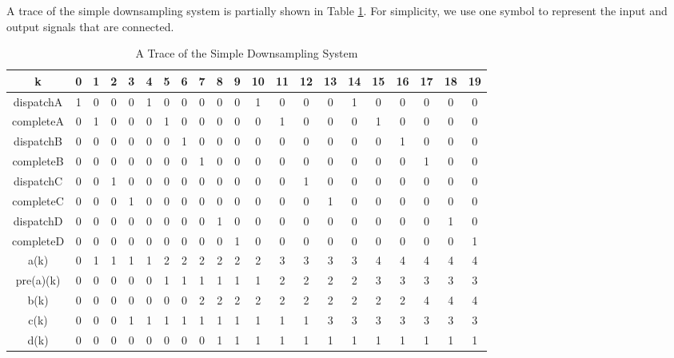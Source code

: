 
A trace of the simple downsampling system is partially shown in Table \ref{tab:table1}. For simplicity, we use one symbol to represent the input and output signals that are connected.
\begin{table}[h!]
\begin{center}
\caption{A Trace of the Simple Downsampling System}
\label{tab:table1}
\begin{tabular}{ |c|c|c|c|c|c|c|c|c|c|c|c|c|c|c|c|c|c|c|c|c|} 
\hline
            k & 0 & 1 & 2 & 3 & 4 & 5 & 6 & 7 & 8 & 9 & 10  & 11 & 12 & 13 & 14 & 15 & 16 & 17 & 18 & 19 \\
\hline
dispatchA  & 1 & 0 & 0 & 0 & 1 & 0 & 0 & 0 & 0 & 0 & 1 & 0 & 0 & 0 & 1 & 0 & 0 & 0 & 0 & 0  \\ 
\hline
completeA & 0 & 1 & 0 & 0 & 0 & 1 & 0 & 0 & 0 & 0 & 0 & 1 & 0 & 0 & 0 & 1 & 0 & 0 & 0 & 0  \\ 
\hline
dispatchB & 0 & 0 & 0 & 0 & 0 & 0 & 1 & 0 & 0 & 0 & 0 & 0 & 0 & 0 & 0 & 0 & 1 & 0 & 0 & 0  \\ 
\hline
completeB & 0 & 0 & 0 &0 & 0 & 0 & 0 & 1 & 0 & 0 & 0 & 0 & 0 & 0 & 0 & 0 & 0 & 1 & 0 & 0 \\ 
\hline
dispatchC & 0 & 0 & 1 & 0 & 0 & 0 & 0 & 0 & 0 & 0 & 0 & 0 & 1 & 0 & 0 & 0 & 0 & 0 & 0 & 0  \\ 
\hline
completeC & 0 & 0 & 0 & 1  & 0 & 0 & 0 & 0 & 0 & 0 & 0 & 0 & 0 & 1 & 0 & 0 & 0 & 0 & 0 & 0 \\ 
\hline
dispatchD & 0 & 0 & 0 & 0 & 0 & 0 & 0 & 0 & 1 & 0 & 0 & 0 & 0 & 0 & 0 & 0 & 0 & 0 & 1 & 0 \\ 
\hline
completeD & 0 & 0 & 0 & 0  & 0 & 0 & 0 & 0 & 0 & 1 & 0 & 0 & 0 & 0 & 0 & 0 & 0 & 0 & 0 & 1 \\ 
\hline
a(k) & 0 & 1 & 1 & 1 & 1 & 2 & 2 & 2 & 2 & 2 & 2 & 3 & 3 & 3 & 3 & 4 & 4 & 4 & 4 & 4 \\
\hline
pre(a)(k) & 0 & 0 & 0 & 0 & 0 & 1 & 1 & 1 & 1 & 1 & 1 & 2 & 2 & 2 & 2 & 3 & 3 & 3 & 3 & 3 \\
\hline
b(k) & 0 & 0 & 0 & 0 & 0 & 0 & 0 & 2 & 2 & 2 & 2 & 2 & 2 & 2 & 2 & 2 & 2 & 4 & 4 & 4 \\
\hline
c(k) & 0 & 0 & 0 & 1 & 1 & 1 & 1 & 1 & 1 & 1 & 1 & 1 & 1 & 3 & 3 & 3 & 3 & 3 & 3 & 3 \\
\hline
d(k) & 0 & 0 & 0 & 0 & 0 & 0 & 0 & 0 & 1 & 1 & 1 & 1 & 1 & 1 & 1 & 1 & 1 & 1 & 1 & 1 \\
\hline
\end{tabular}
\end{center}
\end{table}


